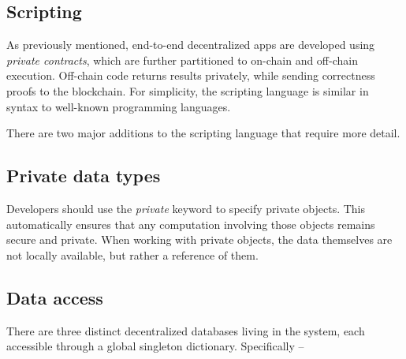 \documentclass{article} \usepackage{nips13submit_e,times}
\begin{document}
\subsection{Scripting}

As previously mentioned, end-to-end decentralized apps are developed using \textit{private contracts}, which are further partitioned to on-chain and off-chain execution. Off-chain code returns results privately, while sending correctness proofs to the blockchain. For simplicity, the scripting language is similar in syntax to well-known programming languages.

There are two major additions to the scripting language that require more detail.

\subsection{Private data types}

Developers should use the \textit{private} keyword to specify private objects. This automatically ensures that any computation involving those objects remains secure and private. When working with private objects, the data themselves are not locally available, but rather a reference of them.

\subsection{Data access}

There are three distinct decentralized databases living in the system, each accessible through a global singleton dictionary. Specifically --
\end{document}
